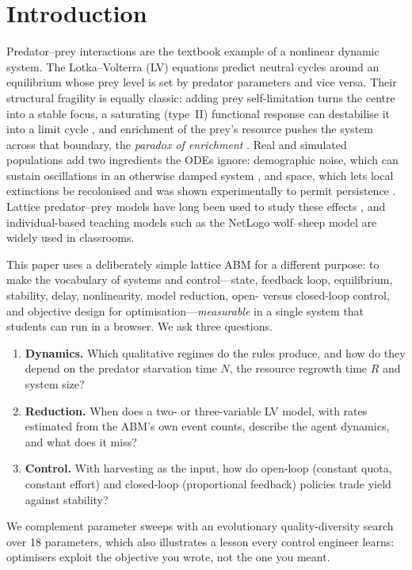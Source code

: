 \section{Introduction}
Predator--prey interactions are the textbook example of a nonlinear dynamic system. The Lotka--Volterra
(LV) equations \cite{lotka1925,volterra1926} predict neutral cycles around an equilibrium whose prey level is
set by predator parameters and vice versa. Their structural fragility is equally classic: adding prey
self-limitation turns the centre into a stable focus, a saturating (type~II) functional response can
destabilise it into a limit cycle \cite{rosenzweig1963}, and enrichment of the prey's resource pushes the
system across that boundary, the \emph{paradox of enrichment} \cite{rosenzweig1971}. Real and simulated
populations add two ingredients the ODEs ignore: demographic noise, which can sustain oscillations in an
otherwise damped system \cite{mckane2005}, and space, which lets local extinctions be recolonised and was
shown experimentally to permit persistence \cite{huffaker1958}. Lattice predator--prey models have long been
used to study these effects \cite{durrett1994,pascual1999}, and individual-based teaching models such as the
NetLogo wolf--sheep model \cite{wilensky1997} are widely used in classrooms.

This paper uses a deliberately simple lattice ABM for a different purpose: to make the vocabulary of
systems and control---state, feedback loop, equilibrium, stability, delay, nonlinearity, model reduction,
open- versus closed-loop control, and objective design for optimisation---\emph{measurable} in a single
system that students can run in a browser. We ask three questions.
\begin{enumerate}[nosep,leftmargin=*]
  \item \textbf{Dynamics.} Which qualitative regimes do the rules produce, and how do they depend on the
        predator starvation time $N$, the resource regrowth time $R$ and system size?
  \item \textbf{Reduction.} When does a two- or three-variable LV model, with rates estimated from the
        ABM's own event counts, describe the agent dynamics, and what does it miss?
  \item \textbf{Control.} With harvesting as the input, how do open-loop (constant quota, constant
        effort) and closed-loop (proportional feedback) policies trade yield against stability?
\end{enumerate}
We complement parameter sweeps with an evolutionary quality-diversity search over 18 parameters, which
also illustrates a lesson every control engineer learns: optimisers exploit the objective you wrote, not
the one you meant.

